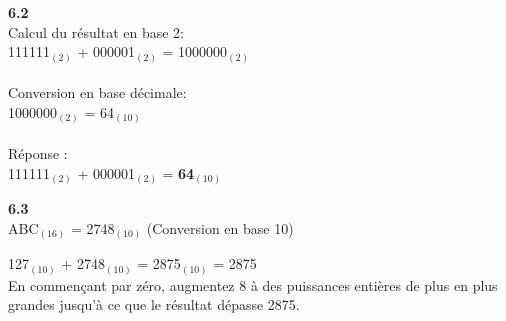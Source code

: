 \begin{Exercice}[20 minutes]
\begin{solution}
    \end{solution}
    \begin{solution} \textbf{6.2}\\
        Calcul du résultat en base 2:\\
        111111$_{(2)}$ + 000001$_{(2)}$ = 1000000$_{(2)}$\\\\
        Conversion en base décimale:\\
        1000000$_{(2)}$ = 64$_{(10)}$\\\\
        Réponse :\\
        111111$_{(2)}$ + 000001$_{(2)}$ = \textbf{64$_{(10)}$}\\
    \end{solution}
    
    \begin{solution} \textbf{6.3}\\
        ABC$_{(16)}$ = 2748$_{(10)}$ (Conversion en base 10)\\
       
        
        127$_{(10)}$ + 2748$_{(10)}$ = 2875$_{(10)}$ = 2875\\

        En commençant par zéro, augmentez 8 à des puissances entières de plus en plus grandes jusqu'à ce que le résultat dépasse 2875.\\
        

\end{solution}
\end{Exercice}
